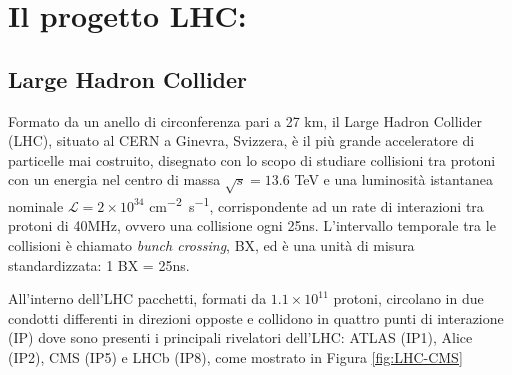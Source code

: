 \chapter{Il progetto LHC:}


\section{Large Hadron Collider}
Formato da un anello di circonferenza pari a 27 km, il Large Hadron Collider (LHC), situato al CERN a Ginevra, Svizzera, è il più grande acceleratore di particelle mai costruito, disegnato con lo scopo di studiare collisioni tra protoni con un energia nel centro di massa $\sqrt{s} = 13.6$ TeV e una luminosità istantanea nominale $\mathcal{L} = 2 \times 10^{34}$ \si{cm^{-2} s^{-1}}, corrispondente ad un rate di interazioni tra protoni di 40MHz, ovvero una collisione ogni 25ns. L'intervallo temporale tra le collisioni è chiamato \textit{bunch crossing}, BX, ed è una unità di misura standardizzata: 1 BX = 25ns.

All'interno dell'LHC pacchetti, formati da $1.1 \times 10^{11}$ protoni, circolano in due condotti differenti in direzioni opposte e collidono in quattro punti di interazione (IP) dove sono presenti i principali rivelatori dell'LHC: ATLAS (IP1), Alice (IP2), CMS (IP5) e LHCb (IP8), come mostrato in Figura \ref{fig:LHC-CMS}

